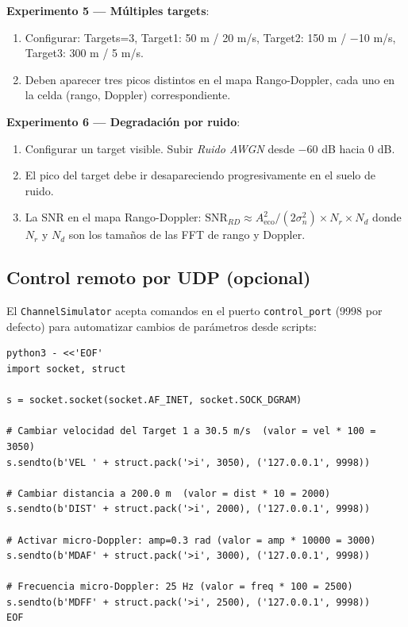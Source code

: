 \documentclass[11pt,a4paper]{article}
\begin{document}
\textbf{Experimento 5 — Múltiples targets}:
\begin{enumerate}
  \item Configurar: Targets=3, Target1: 50 m / 20 m/s,
        Target2: 150 m / −10 m/s, Target3: 300 m / 5 m/s.
  \item Deben aparecer tres picos distintos en el mapa Rango-Doppler,
        cada uno en la celda (rango, Doppler) correspondiente.
\end{enumerate}

\textbf{Experimento 6 — Degradación por ruido}:
\begin{enumerate}
  \item Configurar un target visible. Subir \textit{Ruido AWGN}
        desde $-60$ dB hacia $0$ dB.
  \item El pico del target debe ir desapareciendo progresivamente en el suelo de ruido.
  \item La SNR en el mapa Rango-Doppler: $\text{SNR}_{RD} \approx
        A_\text{eco}^2 / (2\sigma_n^2) \times N_r \times N_d$
        donde $N_r$ y $N_d$ son los tamaños de las FFT de rango y Doppler.
\end{enumerate}

\subsection{Control remoto por UDP (opcional)}

El \texttt{ChannelSimulator} acepta comandos en el puerto \texttt{control\_port} (9998
por defecto) para automatizar cambios de parámetros desde scripts:

\begin{lstlisting}[style=bash, caption={Ejemplos de control UDP desde Python}]
python3 - <<'EOF'
import socket, struct

s = socket.socket(socket.AF_INET, socket.SOCK_DGRAM)

# Cambiar velocidad del Target 1 a 30.5 m/s  (valor = vel * 100 = 3050)
s.sendto(b'VEL ' + struct.pack('>i', 3050), ('127.0.0.1', 9998))

# Cambiar distancia a 200.0 m  (valor = dist * 10 = 2000)
s.sendto(b'DIST' + struct.pack('>i', 2000), ('127.0.0.1', 9998))

# Activar micro-Doppler: amp=0.3 rad (valor = amp * 10000 = 3000)
s.sendto(b'MDAF' + struct.pack('>i', 3000), ('127.0.0.1', 9998))

# Frecuencia micro-Doppler: 25 Hz (valor = freq * 100 = 2500)
s.sendto(b'MDFF' + struct.pack('>i', 2500), ('127.0.0.1', 9998))
EOF
\end{lstlisting}
\end{document}
